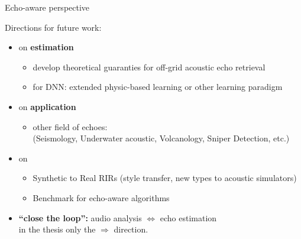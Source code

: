 \begin{frame}{Echo-aware perspective}

    Directions for future work:
    \begin{itemize}
        \item[\mytriag] on \textbf{estimation}
        \begin{itemize}\small
            \item develop theoretical guaranties for off-grid acoustic echo retrieval
            \item for DNN: extended physic-based learning or other learning paradigm
            \\
        \end{itemize}

        \vfill
        \item[\mytriag] on \textbf{application}
        \begin{itemize}
            \item other field of echoes:
            \\(Seismology, Underwater acoustic, Volcanology, Sniper Detection, etc.)
        \end{itemize}

        \vfill
        \item[\mytriag] on \dechorate
        \begin{itemize}
            \item Synthetic to Real RIRs (style transfer, new types to acoustic simulators)
            \item Benchmark for echo-aware algorithms
        \end{itemize}

        \vfill
        \item[\mytriag] \textbf{``close the loop'':} audio analysis $\Leftrightarrow$ echo estimation
        \\in the thesis only the $\Rightarrow$ direction.
    \end{itemize}

\end{frame}


